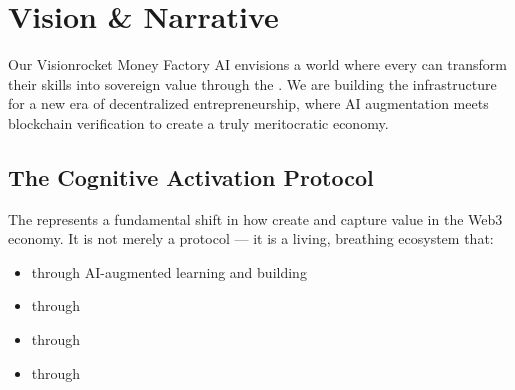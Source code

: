
\section{Vision \& Narrative}

\begin{mfai-box}{Our Vision}{rocket}
Money Factory AI envisions a world where every  can transform their skills into sovereign value through the . We are building the infrastructure for a new era of decentralized entrepreneurship, where AI augmentation meets blockchain verification to create a truly meritocratic economy.
\end{mfai-box}

\subsection{The Cognitive Activation Protocol}

The  represents a fundamental shift in how  create and capture value in the Web3 economy. It is not merely a protocol — it is a living, breathing ecosystem that:

\begin{itemize}[leftmargin=*]
\item {} through AI-augmented learning and building
\item {} through 
\item {} through 
\item {} through 
\end{itemize}

\begin{center}
\end{center}

